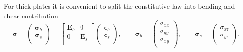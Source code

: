 \documentclass[preprint,12pt]{elsarticle}
\begin{document}
For thick plates it is convenient to split the constitutive law into bending and shear contribution
\begin{equation}
\bm{\sigma} = 
\begin{pmatrix}
\bm{\sigma}_b \\
\bm{\sigma}_s \\
\end{pmatrix} = 
\begin{bmatrix}
\bm{E}_b & 0 \\
0 & \bm{E}_s \\
\end{bmatrix}
\begin{pmatrix}
\bm{\epsilon}_b \\
\bm{\epsilon}_s \\
\end{pmatrix},
\qquad
\bm{\sigma}_b = 
\begin{pmatrix}
\sigma_{xx} \\
\sigma_{yy} \\
\sigma_{xy} \\
\end{pmatrix},
\qquad
\bm{\sigma}_s = 
\begin{pmatrix}
\sigma_{xz} \\
\sigma_{yz} \\
\end{pmatrix}.
\end{equation}
\end{document}
